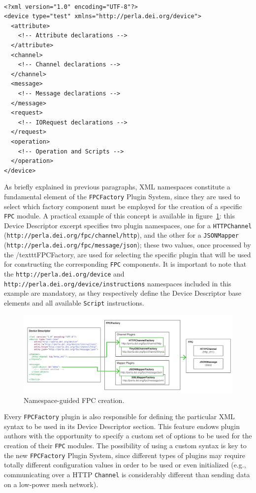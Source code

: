 ~\\
\lstset{language=XML}
\begin{lstlisting}[caption={The skeleton of the new XML Device Descriptor.}]
<?xml version="1.0" encoding="UTF-8"?>
<device type="test" xmlns="http://perla.dei.org/device">
  <attribute>
    <!-- Attribute declarations -->
  </attribute>
  <channel>
    <!-- Channel declarations -->
  </channel>
  <message>
    <!-- Message declarations -->
  </message>
  <request>
    <!-- IORequest declarations -->
  </request>
  <operation>
    <!-- Operation and Scripts -->
  </operation>
</device>
\end{lstlisting}

As briefly explained in previous paragraphs, XML namespaces constitute a
fundamental element of the \texttt{FPCFactory} Plugin System, since they are
used to select which factory component must be employed for the creation of a
specific \texttt{FPC} module. A practical example of this concept is available
in figure~\ref{fig:dd_namespace}: this Device Descriptor excerpt specifies two
plugin namespaces, one for a \texttt{HTTPChannel}
(\texttt{http://perla.dei.org/fpc/channel/http}), and the other for a
\texttt{JSONMapper} (\texttt{http://perla.dei.org/fpc/message/json}); these two
values, once processed by the /texttt{FPCFactory}, are used for selecting the
specific plugin that will be used for constructing the corresponding
\texttt{FPC} components. It is important to note that the
\texttt{http://perla.dei.org/device} and
\texttt{http://perla.dei.org/device/instructions} namespaces included in this
example are mandatory, as they respectively define the Device Descriptor base
elements and all available \texttt{Script} instructions.

\begin{figure}[h!]
\center
\includegraphics[width=\textwidth]{imgs/dd_namespace.pdf}
\caption{Namespace-guided FPC creation.}
\label{fig:dd_namespace}
\end{figure}

Every \texttt{FPCFactory} plugin is also responsible for defining the
particular XML syntax to be used in its Device Descriptor section. This feature
endows plugin authors with the opportunity to specify a custom set of options
to be used for the creation of their \texttt{FPC} modules. The possibility of
using a custom syntax is key to the new \texttt{FPCFactory} Plugin System,
since different types of plugins may require totally different configuration
values in order to be used or even initialized (e.g., communicating over a HTTP
\texttt{Channel} is considerably different than sending data on a low-power
mesh network).



